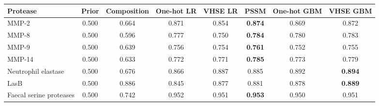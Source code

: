 \begin{tabular}{@{}lccccccc@{}}\toprule
Protease & Prior & Composition & One-hot LR & VHSE LR & PSSM & One-hot GBM & VHSE GBM \\\midrule
MMP-2 & 0.500 & 0.664 & 0.871 & 0.854 & \textbf{0.874} & 0.869 & 0.872 \\
MMP-8 & 0.500 & 0.596 & 0.777 & 0.750 & \textbf{0.784} & 0.780 & 0.783 \\
MMP-9 & 0.500 & 0.639 & 0.756 & 0.754 & \textbf{0.761} & 0.752 & 0.755 \\
MMP-14 & 0.500 & 0.633 & 0.772 & 0.771 & \textbf{0.785} & 0.773 & 0.779 \\
Neutrophil elastase & 0.500 & 0.676 & 0.866 & 0.887 & 0.885 & 0.892 & \textbf{0.894} \\
LasB & 0.500 & 0.886 & 0.845 & 0.877 & 0.881 & 0.878 & \textbf{0.889} \\
Faecal serine proteases & 0.500 & 0.742 & 0.952 & 0.951 & \textbf{0.953} & 0.950 & 0.951 \\
\bottomrule\end{tabular}
